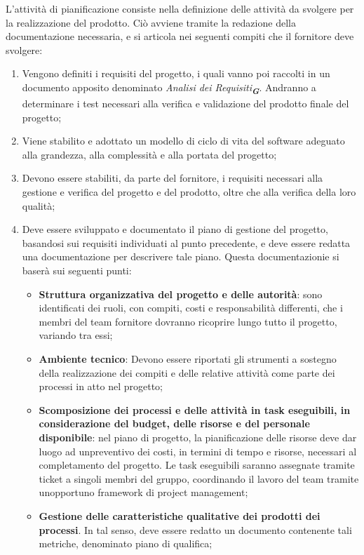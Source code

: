 L'attività di pianificazione consiste nella definizione delle attività da svolgere per la realizzazione del prodotto. Ciò avviene tramite la redazione della documentazione necessaria, e si articola nei seguenti compiti che il fornitore deve svolgere:
\begin{enumerate}
    \item Vengono definiti i requisiti del progetto, i quali vanno poi raccolti in un documento apposito denominato \emph{Analisi dei Requisiti}\textsubscript{\textit{\textbf{G}}}. Andranno a determinare i test necessari alla verifica e validazione del prodotto finale del progetto;
    \item Viene stabilito e adottato un modello di ciclo di vita del software adeguato alla grandezza, alla complessità e alla portata del progetto;
    \item Devono essere stabiliti, da parte del fornitore, i requisiti necessari alla gestione e verifica del progetto e del prodotto, oltre che alla verifica della loro qualità;
    \item Deve essere sviluppato e documentato il piano di gestione del progetto, basandosi sui requisiti individuati al punto precedente, e deve essere redatta una documentazione per descrivere tale piano. Questa documentazionie si baserà sui seguenti punti:
    \begin{itemize}
        \item \textbf{Struttura organizzativa del progetto e delle autorità}: sono identificati dei ruoli, con compiti, costi e responsabilità differenti, che i membri del team fornitore dovranno ricoprire lungo tutto il progetto, variando tra essi;
        \item \textbf{Ambiente tecnico}: Devono essere riportati gli strumenti a sostegno della realizzazione dei compiti e delle relative attività come parte dei processi in atto nel progetto;
        \item \textbf{Scomposizione dei processi e delle attività in task eseguibili, in considerazione del budget, delle risorse e del personale disponibile}: nel piano di progetto, la pianificazione delle risorse deve dar luogo ad unpreventivo dei costi, in termini di tempo e risorse, necessari al completamento del progetto. Le task eseguibili saranno assegnate tramite ticket a singoli membri del gruppo, coordinando il lavoro del team tramite unopportuno framework di project management;
        \item \textbf{Gestione delle caratteristiche qualitative dei prodotti dei processi}. In tal senso, deve essere redatto un documento contenente tali metriche, denominato piano di qualifica;

\end{itemize}
\end{enumerate}
